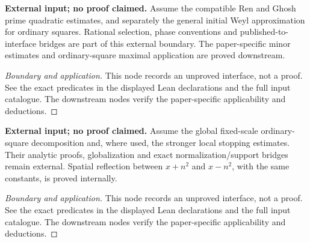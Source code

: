 \begin{lemma}
\label{input_quadratic_sums}
\textbf{External input; no proof claimed.} Assume the compatible Ren and Ghosh prime quadratic estimates, and separately the general initial Weyl approximation for ordinary squares. Rational selection, phase conventions and published-to-interface bridges are part of this external boundary. The paper-specific minor estimates and ordinary-square maximal application are proved downstream.
\end{lemma}
\begin{proof}[Boundary and application]
This node records an unproved interface, not a proof. See the exact predicates in the displayed Lean declarations and the full input catalogue. The downstream nodes verify the paper-specific applicability and deductions.
\end{proof}

\begin{lemma}
\label{input_ordinary_squares}
\textbf{External input; no proof claimed.} Assume the global fixed-scale ordinary-square decomposition and, where used, the stronger local stopping estimates. Their analytic proofs, globalization and exact normalization/support bridges remain external. Spatial reflection between $x+n^2$ and $x-n^2$, with the same constants, is proved internally.
\end{lemma}
\begin{proof}[Boundary and application]
This node records an unproved interface, not a proof. See the exact predicates in the displayed Lean declarations and the full input catalogue. The downstream nodes verify the paper-specific applicability and deductions.
\end{proof}

